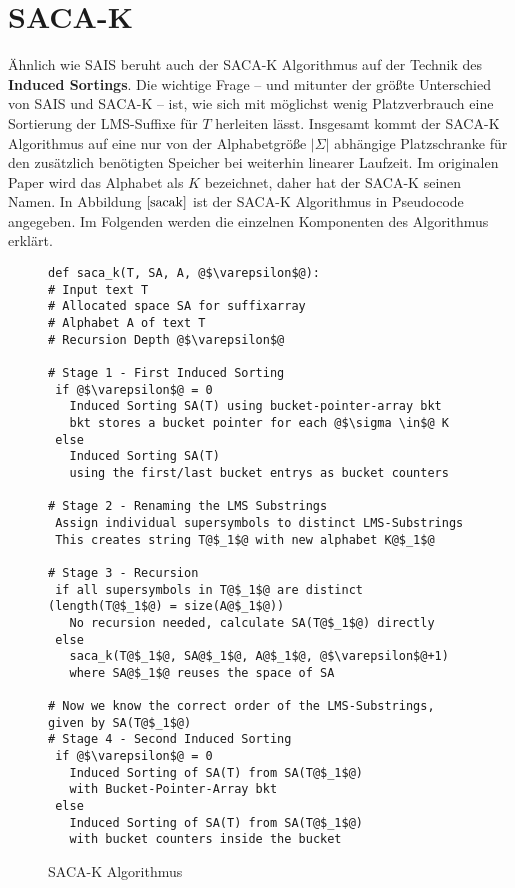 \section{SACA-K}
\label{section:saca_k}

\newcommand {\suf} {\text{suf}}
\newcommand {\level} {\varepsilon}
\newcommand {\symbWidth} {0.3cm}

Ähnlich wie SAIS beruht auch der SACA-K Algorithmus auf der Technik des \textbf{Induced Sortings}. Die wichtige Frage -- und mitunter der größte Unterschied von SAIS und SACA-K -- ist, wie sich mit möglichst wenig Platzverbrauch eine Sortierung der LMS-Suffixe für $T$ herleiten lässt. Insgesamt kommt der SACA-K Algorithmus auf eine nur von der Alphabetgröße $|\Sigma|$ abhängige Platzschranke für den zusätzlich benötigten Speicher bei weiterhin linearer Laufzeit. Im originalen Paper wird das Alphabet als $K$ bezeichnet, daher hat der SACA-K seinen Namen. In Abbildung $\ref{sacak}$ ist der SACA-K Algorithmus in Pseudocode angegeben. Im Folgenden werden die einzelnen Komponenten des Algorithmus erklärt. \\

\begin{figure}
\begin{verbatim}
def saca_k(T, SA, A, @$\varepsilon$@):
# Input text T
# Allocated space SA for suffixarray
# Alphabet A of text T
# Recursion Depth @$\varepsilon$@

# Stage 1 - First Induced Sorting
 if @$\varepsilon$@ = 0
   Induced Sorting SA(T) using bucket-pointer-array bkt 
   bkt stores a bucket pointer for each @$\sigma \in$@ K
 else
   Induced Sorting SA(T) 
   using the first/last bucket entrys as bucket counters
		
# Stage 2 - Renaming the LMS Substrings
 Assign individual supersymbols to distinct LMS-Substrings
 This creates string T@$_1$@ with new alphabet K@$_1$@
	
# Stage 3 - Recursion
 if all supersymbols in T@$_1$@ are distinct (length(T@$_1$@) = size(A@$_1$@))
   No recursion needed, calculate SA(T@$_1$@) directly
 else
   saca_k(T@$_1$@, SA@$_1$@, A@$_1$@, @$\varepsilon$@+1)
   where SA@$_1$@ reuses the space of SA

# Now we know the correct order of the LMS-Substrings, given by SA(T@$_1$@)
# Stage 4 - Second Induced Sorting
 if @$\varepsilon$@ = 0
   Induced Sorting of SA(T) from SA(T@$_1$@) 
   with Bucket-Pointer-Array bkt
 else
   Induced Sorting of SA(T) from SA(T@$_1$@) 
   with bucket counters inside the bucket

\end{verbatim}
\caption{SACA-K Algorithmus} \cite{saca:7}
\label{sacak}
\end{figure}

